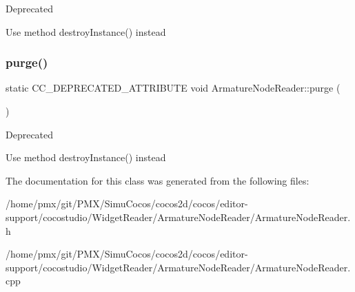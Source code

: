 \begin{DoxyRefDesc}{Deprecated}
\item[\hyperlink{deprecated__deprecated000083}{Deprecated}]Use method destroy\+Instance() instead \end{DoxyRefDesc}
\mbox{\label{classArmatureNodeReader_a9cb29fa475333529d6b91f75f7ef0b41}} 
\subsubsection{\texorpdfstring{purge()}{purge()}\hspace{0.1cm}{\footnotesize\ttfamily [2/2]}}
{\footnotesize\ttfamily static C\+C\+\_\+\+D\+E\+P\+R\+E\+C\+A\+T\+E\+D\+\_\+\+A\+T\+T\+R\+I\+B\+U\+TE void Armature\+Node\+Reader\+::purge (\begin{DoxyParamCaption}{ }\end{DoxyParamCaption})\hspace{0.3cm}{\ttfamily [static]}}

\begin{DoxyRefDesc}{Deprecated}
\item[\hyperlink{deprecated__deprecated000318}{Deprecated}]Use method destroy\+Instance() instead \end{DoxyRefDesc}


The documentation for this class was generated from the following files\+:\begin{DoxyCompactItemize}
\item 
/home/pmx/git/\+P\+M\+X/\+Simu\+Cocos/cocos2d/cocos/editor-\/support/cocostudio/\+Widget\+Reader/\+Armature\+Node\+Reader/Armature\+Node\+Reader.\+h\item 
/home/pmx/git/\+P\+M\+X/\+Simu\+Cocos/cocos2d/cocos/editor-\/support/cocostudio/\+Widget\+Reader/\+Armature\+Node\+Reader/Armature\+Node\+Reader.\+cpp\end{DoxyCompactItemize}
